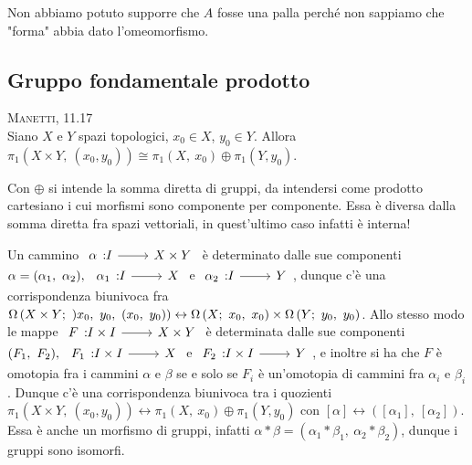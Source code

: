 \begin{attention}
	Non abbiamo potuto supporre che $A$ fosse una palla perché non sappiamo che "forma" abbia dato l'omeomorfismo.
\end{attention}


	\subsection{Gruppo fondamentale prodotto}
	
\begin{theorema} \textsc{Manetti, 11.17}\\
	Siano $X$ e $Y$ spazi topologici, $x_0\in X$, $y_0\in Y$. Allora $\pi_1\left( X\times Y,\ (x_0,y_0)\right) \cong \pi_1(X,\ x_0)\oplus \pi_1(Y,y_0)$.
\end{theorema}
\begin{attention}
	Con $\oplus$ si intende la somma diretta di gruppi, da intendersi come prodotto cartesiano i cui morfismi sono componente per componente. Essa è diversa dalla somma diretta fra spazi vettoriali, in quest'ultimo caso infatti è interna!
\end{attention}
\begin{demonstration}
	Un cammino $\funz \alpha I {X\times Y}$ è determinato dalle sue componenti $\alpha=(\alpha_1,\ \alpha_2),\ \funz {\alpha_1} I X$ e $\funz {\alpha_2} I Y$, dunque c'è una corrispondenza biunivoca fra \\ $\inscam{X\times Y}{)x_0,\ y_0}{(x_0,\ y_0)}\leftrightarrow\inscam{X}{x_0}{x_0}\times \inscam{Y}{y_0}{y_0}$. Allo stesso modo le mappe $\funz F {I\times I} {X\times Y}$ è determinata dalle sue componenti $(F_1,\ F_2),\ \funz {F_1} {I\times I} X$ e $\funz {F_2} {I\times I} Y$, e inoltre si ha che $F$ è omotopia fra i cammini $\alpha$ e $\beta$ se e solo se $F_i$ è un'omotopia di cammini fra $\alpha_i$ e $\beta_i$. Dunque c'è una corrispondenza biunivoca tra i quozienti $\pi_1\left( X\times Y,\ (x_0,y_0)\right) \leftrightarrow \pi_1(X,\ x_0)\oplus \pi_1(Y,y_0)$ con $[\alpha]\leftrightarrow ([\alpha_1],\ [\alpha_2])$. Essa è anche un morfismo di gruppi, infatti $\alpha\ast\beta = (\alpha_1\ast\beta_1,\ \alpha_2\ast\beta_2)$, dunque i gruppi sono isomorfi.
\end{demonstration}


